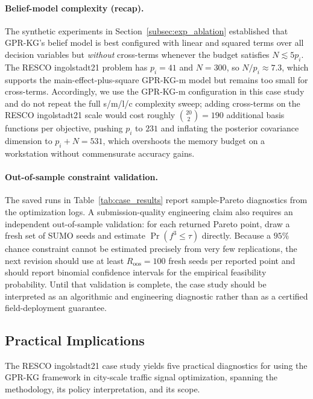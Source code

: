 \documentclass[12pt]{article}
\theoremstyle{plain}
\theoremstyle{definition}
\theoremstyle{remark}
\begin{document}
\paragraph{Belief-model complexity (recap).}
The synthetic experiments in Section~\ref{subsec:exp_ablation}
established that GPR-KG's belief model is best configured with linear
and squared terms over all decision variables but \emph{without}
cross-terms whenever the budget satisfies $N\lesssim 5p_{i}$.  The
RESCO ingolstadt21 problem has $p_{i}=41$ and $N=300$, so
$N/p_{i}\approx 7.3$, which supports the main-effect-plus-square
GPR-KG-m model but remains too small for cross-terms.
Accordingly, we use the GPR-KG-m configuration in this case study and
do not repeat the full s/m/l/c complexity sweep; adding cross-terms on
the RESCO ingolstadt21 scale would cost roughly $\binom{20}{2}=190$ additional
basis functions per objective, pushing $p_{i}$ to $231$ and inflating
the posterior covariance dimension to $p_{i}+N=531$, which overshoots
the memory budget on a workstation without commensurate accuracy
gains.

\paragraph{Out-of-sample constraint validation.}
The saved runs in Table~\ref{tab:case_results} report sample-Pareto
diagnostics from the optimization logs.  A submission-quality
engineering claim also requires an independent out-of-sample validation:
for each returned Pareto point, draw a fresh set of SUMO seeds and
estimate $\Pr(f^{3}\le\tau)$ directly.  Because a $95\%$ chance
constraint cannot be estimated precisely from very few replications, the
next revision should use at least $R_{\mathrm{oos}}=100$ fresh seeds per
reported point and should report binomial confidence intervals for the
empirical feasibility probability.  Until that validation is complete,
the case study should be interpreted as an algorithmic and engineering
diagnostic rather than as a certified field-deployment guarantee.


\subsection{Practical Implications}\label{subsec:case_implications}

The RESCO ingolstadt21 case study yields five practical diagnostics for
using the GPR-KG framework in city-scale traffic signal optimization,
spanning the methodology, its policy interpretation, and its scope.
\end{document}
